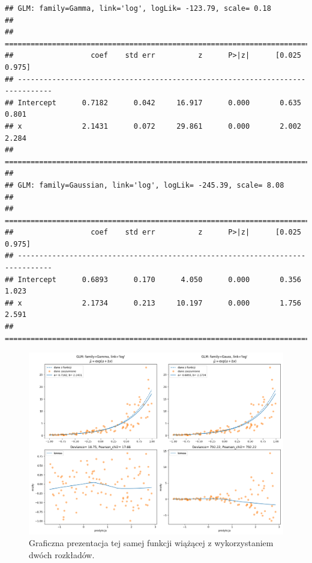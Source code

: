 \documentclass[polish,]{book}
\begin{document}
\begin{verbatim}
## GLM: family=Gamma, link='log', logLik= -123.79, scale= 0.18
## 
## ==============================================================================
##                  coef    std err          z      P>|z|      [0.025      0.975]
## ------------------------------------------------------------------------------
## Intercept      0.7182      0.042     16.917      0.000       0.635       0.801
## x              2.1431      0.072     29.861      0.000       2.002       2.284
## ==============================================================================
## 
## GLM: family=Gaussian, link='log', logLik= -245.39, scale= 8.08
## 
## ==============================================================================
##                  coef    std err          z      P>|z|      [0.025      0.975]
## ------------------------------------------------------------------------------
## Intercept      0.6893      0.170      4.050      0.000       0.356       1.023
## x              2.1734      0.213     10.197      0.000       1.756       2.591
## ==============================================================================
\end{verbatim}

\begin{figure}[h]

{\centering \includegraphics[width=1\linewidth]{modgam01} 

}

\caption{Graficzna prezentacja tej samej funkcji wiążącej z wykorzystaniem dwóch rozkładów.}\label{fig:modgam01}
\end{figure}
\end{document}
